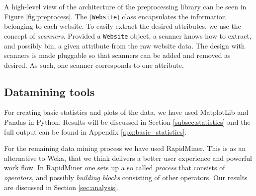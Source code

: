 A high-level view of the architecture of the preprocessing library can be seen in Figure \ref{fig:preprocess}. The (\texttt{Website}) class encapsulates the information belonging to each website. To easily extract the desired attributes, we use the concept of \textit{scanners}. Provided  a \texttt{Website} object, a scanner knows how to extract, and possibly bin, a given attribute from the raw website data. The design with scanners is made pluggable so that scanners can be added and removed as desired. As such, one scanner corresponds to one attribute.


\subsection{Datamining tools}
\label{subsec:weka}

For creating basic statistics and plots of the data, we have used MatplotLib\cite{matplotlib} and Pandas\cite{pandas} in Python. Results will be discussed in Section \ref{subsec:statistics} and the full output can be found in Appendix \ref{apx:basic_statistics}.

For the remaining data mining process we have used RapidMiner\cite{rapidminer}. This is as an alternative to Weka\cite{weka}, that we think delivers a better user experience and powerful work flow. In RapidMiner one sets up a so called \textit{process} that consists of \textit{operators}, and possibly \textit{building blocks} consisting of other operators. Our results are discussed in Section \ref{sec:analysis}.




